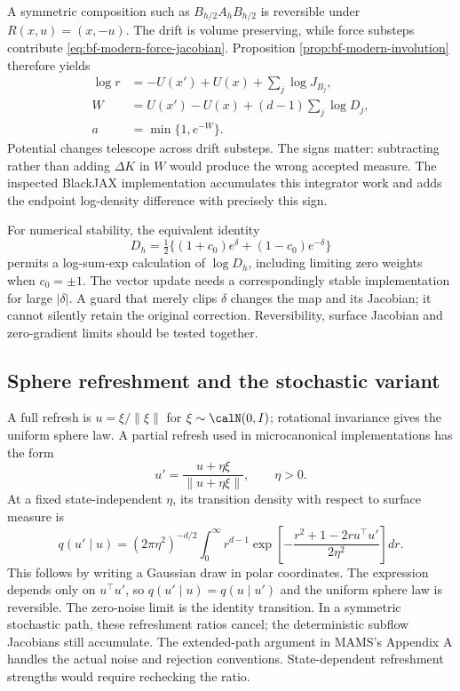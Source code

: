 A symmetric composition such as $B_{h/2}A_hB_{h/2}$ is reversible under
$R(x,u)=(x,-u)$. The drift is volume preserving, while force substeps
contribute \eqref{eq:bf-modern-force-jacobian}. Proposition
\ref{prop:bf-modern-involution} therefore yields
\begin{align}
 \log r&=-U(x')+U(x)+\sum_j\log J_{B_j},\\
 W&=U(x')-U(x)+(d-1)\sum_j\log D_j,\\
 a&=\min\{1,e^{-W}\}.
 \label{eq:bf-modern-mams-acceptance}
\end{align}
Potential changes telescope across drift substeps. The signs matter:
subtracting rather than adding $\Delta K$ in $W$ would produce the wrong
accepted measure. The inspected BlackJAX implementation accumulates this
integrator work and adds the endpoint log-density difference with precisely
this sign.

For numerical stability, the equivalent identity
\begin{equation}
 D_h=\tfrac12\{(1+c_0)e^\delta+(1-c_0)e^{-\delta}\}
 \label{eq:bf-modern-stable-force-denominator}
\end{equation}
permits a log-sum-exp calculation of $\log D_h$, including limiting zero
weights when $c_0=\pm1$. The vector update needs a correspondingly stable
implementation for large $|\delta|$. A guard that merely clips $\delta$
changes the map and its Jacobian; it cannot silently retain the original
correction. Reversibility, surface Jacobian and zero-gradient limits should
be tested together.

\subsection{Sphere refreshment and the stochastic variant}

A full refresh is $u=\xi/\|\xi\|$ for
$\xi\sim\calN(0,I)$; rotational invariance gives the uniform sphere law.
A partial refresh used in microcanonical implementations has the form
\citep{robnik2025mclmc,robnik2025mams}
\begin{equation}
 u'=\frac{u+\eta\xi}{\|u+\eta\xi\|},\qquad \eta>0.
 \label{eq:bf-modern-sphere-refresh}
\end{equation}
At a fixed state-independent $\eta$, its transition density with respect to
surface measure is
\begin{equation}
 q(u'\mid u)=(2\pi\eta^2)^{-d/2}\int_0^\infty r^{d-1}
    \exp\!\left[-\frac{r^2+1-2r u^\top u'}{2\eta^2}\right]dr.
 \label{eq:bf-modern-sphere-refresh-density}
\end{equation}
This follows by writing a Gaussian draw in polar coordinates. The expression
depends only on $u^\top u'$, so $q(u'\mid u)=q(u\mid u')$ and the uniform
sphere law is reversible. The zero-noise limit is the identity transition.
In a symmetric stochastic path, these refreshment ratios cancel; the
deterministic subflow Jacobians still accumulate. The extended-path argument
in MAMS's Appendix A handles the actual noise and rejection conventions.
State-dependent refreshment strengths would require rechecking the ratio.

